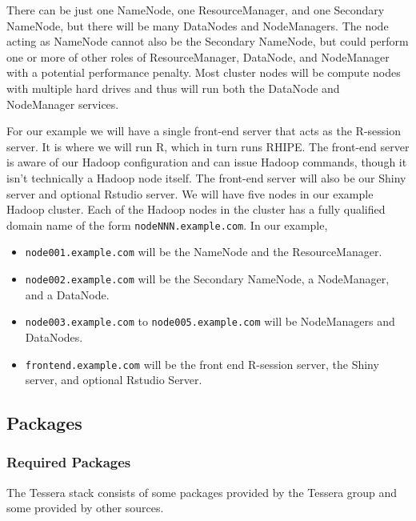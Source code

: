 There can be just one NameNode, one ResourceManager, and one Secondary
NameNode, but there will be many DataNodes and NodeManagers.  The node
acting as NameNode cannot also be the Secondary NameNode, but could
perform one or more of other roles of ResourceManager, DataNode, and
NodeManager with a potential  performance penalty.  Most cluster nodes
will be compute nodes with multiple hard drives and thus will run both
the DataNode and NodeManager services.

For our example we will have a single front-end server that acts as the
R-session server.  It is where we will run R, which in turn runs RHIPE.
The front-end server is aware of our Hadoop configuration and can issue
Hadoop commands, though it isn't technically a Hadoop node itself. The
front-end server will also be our Shiny server and optional Rstudio
server.  We will have five nodes in our example Hadoop cluster.  Each of
the Hadoop nodes in the cluster has a fully qualified domain
name of the form \verb|nodeNNN.example.com|. In our example,

\begin{itemize}
\item \verb|node001.example.com| will be the NameNode and the ResourceManager.
\item \verb|node002.example.com| will be the Secondary NameNode, a NodeManager, and a DataNode. 
\item \verb|node003.example.com| to \verb|node005.example.com| will be NodeManagers and DataNodes. 
\item \verb|frontend.example.com| will be the front end R-session server, the Shiny server, and optional Rstudio Server.
\end{itemize}

\subsection{Packages}
\subsubsection{Required Packages}
The Tessera stack consists of some packages provided by the Tessera group and some provided by other sources. \\

